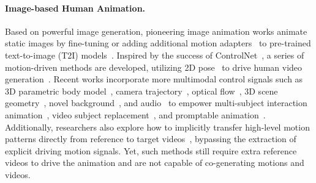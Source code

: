 \paragraph{\bf Image-based Human Animation.} Based on powerful image generation, pioneering image animation works animate static images by fine-tuning or adding additional motion adapters~\cite{guo2023animatediff,karras2023dreampose} to pre-trained text-to-image (T2I) models~\cite{rombach2022sd}. Inspired by the success of ControlNet~\cite{zhang2023controlnet}, a series of motion-driven methods are developed, utilizing 2D pose~\cite{yang2023dwpose} to drive human video generation~\cite{hu2024animate,niu2024mofa,zhang2024mimicmotion,gan2025humandit,taghipour2025latentmove}. Recent works incorporate more multimodal control signals such as 3D parametric body model~\cite{loper2023smpl,romero2022mano,pavlakos2019smplx,zhu2024champ,zhou2024realisdance,zhou2025realisdance,he2025posegen}, camera trajectory~\cite{wang2024humanvid,li2025tokenmotion,shao2025interspatial}, optical flow~\cite{shi2024motioni2v,liao2025motionagent}, 3D scene geometry~\cite{cao2025uni3c,gu2025das}, novel background~\cite{pan2024actanywhere,liang2025realismotion,li2025humangenesis,niu2025anicrafter}, and audio~\cite{huang2025homa,chen2025humo,wang2025interacthuman} to empower multi-subject interaction animation~\cite{wang2025multianimate,wang2025dreamactor}, video subject replacement~\cite{cheng2025wanimate}, and promptable animation~\cite{kim2025tavid,jin2025matrix}. Additionally, researchers also explore how to implicitly transfer high-level motion patterns directly from reference to target videos~\cite{tan2024animatex,tan2025animatepp,song2025xunimotion,bian2025videoasprompt}, bypassing the extraction of explicit driving motion signals. Yet, such methods still require extra reference videos to drive the animation and are not capable of co-generating motions and videos.

\vspace{-2mm}

